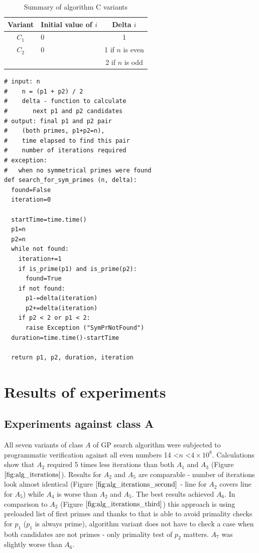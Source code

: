 \documentclass[10pt,twocolumn]{article}
\begin{document}
\begin{table}[ht]
\centering
\caption{Summary of algorithm C variants}
\label{tablealgo}
\begin{tabular}{|c|l|c|}
  \hline 
  \rowcolor{LightCyan}
  Variant & Initial value of $i$ & Delta $i$ \\
  \hline 
  $C_1$ & 0 & 1 \\
  \hline
  $C_2$ & 0 & 1 if $n$ is even  \\
  & & 2 if $n$ is odd \\
  \hline 
\end{tabular} 
\end{table}

\lstset{language=Python}
\lstset{breaklines=true}
\lstset{frame=shadowbox}
\begin{lstlisting}[linewidth=8.7cm]
# input: n
#    n = (p1 + p2) / 2
#    delta - function to calculate
#       next p1 and p2 candidates
# output: final p1 and p2 pair 
#    (both primes, p1+p2=n),
#    time elapsed to find this pair
#    number of iterations required
# exception:
#   when no symmetrical primes were found
def search_for_sym_primes (n, delta):
  found=False
  iteration=0

  startTime=time.time()
  p1=n
  p2=n
  while not found:
    iteration+=1
    if is_prime(p1) and is_prime(p2):
      found=True
    if not found:
      p1-=delta(iteration)
      p2+=delta(iteration)
    if p2 < 2 or p1 < 2:
      raise Exception ("SymPrNotFound")
  duration=time.time()-startTime

  return p1, p2, duration, iteration
\end{lstlisting}

\section{Results of experiments}

\subsection{Experiments against class A}

All seven variants of class $A$ of GP search algorithm were subjected to programmatic verification against all even numbers 14 \textless $n$ \textless $4  \times 10^8$. Calculations show that $A_2$ required 5 times less iterations than both $A_1$ and $A_3$ (Figure $\ref{fig:alg_iterations}$). Results for $A_2$ and $A_5$ are comparable - number of iterations look almost identical (Figure $\ref{fig:alg_iterations_second}$ - line for $A_2$ covers line for $A_5$) while $A_4$ is worse than $A_2$ and $A_5$. The best results achieved $A_6$. In comparison to $A_2$ (Figure $\ref{fig:alg_iterations_third}$) this approach is using preloaded list of first primes and thanks to that is able to avoid primality checks for $p_1$ ($p_1$ is always prime), algorithm variant does not have to check a case when both candidates are not primes - only primality test of $p_2$ matters. $A_7$ was slightly worse than $A_6$. \par
\end{document}
